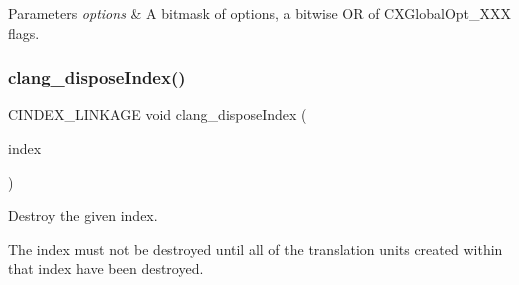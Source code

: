\begin{DoxyParams}{Parameters}
{\em options} & A bitmask of options, a bitwise OR of C\+X\+Global\+Opt\+\_\+\+X\+XX flags. \\
\hline
\end{DoxyParams}
\mbox{\label{group__CINDEX_ga166ab73b14be73cbdcae14d62dbab22a}} 
\subsubsection{\texorpdfstring{clang\+\_\+dispose\+Index()}{clang\_disposeIndex()}}
{\footnotesize\ttfamily C\+I\+N\+D\+E\+X\+\_\+\+L\+I\+N\+K\+A\+GE void clang\+\_\+dispose\+Index (\begin{DoxyParamCaption}\item[{\mbox{\hyperlink{group__CINDEX_gae039c2574bfd75774ca7a9a3e55910cb}{C\+X\+Index}}}]{index }\end{DoxyParamCaption})}



Destroy the given index. 

The index must not be destroyed until all of the translation units created within that index have been destroyed. 